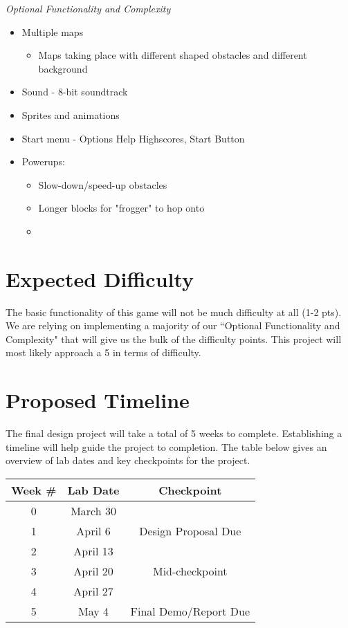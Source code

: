 \documentclass[journal, twocolumn, final,11pt,letterpaper]{IEEEtran}
\begin{document}
\vspace{5mm}

\textit{Optional Functionality and Complexity}
\begin{itemize}
	\item Multiple maps
	\begin{itemize}
		\item Maps taking place with different shaped obstacles and different background
	\end{itemize}
	\item Sound - 8-bit soundtrack
	\item Sprites and animations
	\item Start menu - Options Help Highscores, Start Button
	\item Powerups:
		\begin{itemize}
			\item Slow-down/speed-up obstacles
			\item Longer blocks for "frogger" to hop onto
			\item
		\end{itemize}
\end{itemize}

\section{Expected Difficulty}
The basic functionality of this game will not be much difficulty at all (1-2 pts). We are relying on implementing a majority of our ``Optional Functionality and Complexity" that will give us the bulk of the difficulty points. This project will most likely approach a 5 in terms of difficulty.

\section{Proposed Timeline} 
The final design project will take a total of 5 weeks to complete. Establishing a timeline will help guide the project to completion.  The table below gives an overview of lab dates and key checkpoints for the project.

\begin{table}[htbp]
	\centering
	\begin{tabular}{ccc}	%
		\toprule	%
		Week \# & Lab Date & Checkpoint \\
		\midrule
		0 & March 30 & \\
		1 & April 6 & Design Proposal Due \\
		2 & April 13 & \\
		3 & April 20 & Mid-checkpoint \\
		4 & April 27 & \\
		5 & May 4 & Final Demo/Report Due \\
		
		\bottomrule	%
	\end{tabular}%
	\label{tab:table1}	%
\end{table}%
\end{document}
